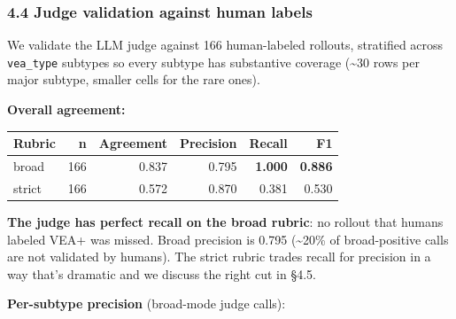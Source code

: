 \documentclass[
]{article}
\begin{document}
\subsubsection{4.4 Judge validation against human
labels}\label{judge-validation-against-human-labels}

We validate the LLM judge against 166 human-labeled rollouts, stratified
across \texttt{vea\_type} subtypes so every subtype has substantive
coverage (\textasciitilde30 rows per major subtype, smaller cells for
the rare ones).

\textbf{Overall agreement:}

\begin{longtable}[]{@{}lrrrrr@{}}
\toprule\noalign{}
Rubric & n & Agreement & Precision & Recall & F1 \\
\midrule\noalign{}
\endhead
\bottomrule\noalign{}
\endlastfoot
broad & 166 & 0.837 & 0.795 & \textbf{1.000} & \textbf{0.886} \\
strict & 166 & 0.572 & 0.870 & 0.381 & 0.530 \\
\end{longtable}

\textbf{The judge has perfect recall on the broad rubric}: no rollout
that humans labeled VEA+ was missed. Broad precision is 0.795
(\textasciitilde20\% of broad-positive calls are not validated by
humans). The strict rubric trades recall for precision in a way that's
dramatic and we discuss the right cut in §4.5.

\textbf{Per-subtype precision} (broad-mode judge calls):
\end{document}
